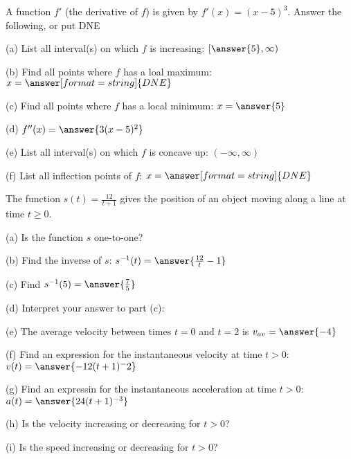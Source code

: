 \documentclass{ximera}
\begin{document}
\begin{exercise}
A function $f'$ (the derivative of $f$) is given by $f'(x)=(x-5)^3$. Answer the following, or put DNE

(a) List all interval(s) on which $f$ is increasing: $[\answer{5},\infty)$

(b) Find all points where $f$ has a loal maximum: $x=\answer[format=string]{DNE}$

(c) Find all points where $f$ has a local minimum: $x=\answer{5}$

(d) $f''(x)=\answer{3(x-5)^2}$

(e) List all interval(s) on which $f$ is concave up: $(-\infty,\infty)$

(f) List all inflection points of $f$: $x=\answer[format=string]{DNE}$

\end{exercise}

\begin{exercise}
The function $s(t)=\frac{12}{t+1}$ gives the position of an object moving along a line at time $t\geq 0$. 

(a) Is the function $s$ one-to-one? 
\begin{multipleChoice}
\end{multipleChoice}

(b) Find the inverse of $s$: $s^{-1}(t)=\answer{\frac{12}{t}-1}$

(c) Find $s^{-1}(5)=\answer{\frac{7}{5}}$

(d) Interpret your answer to part (c):
\begin{multipleChoice}
\end{multipleChoice}

(e) The average velocity between times $t=0$ and $t=2$ is $v_{av}=\answer{-4}$

(f) Find an expression for the instantaneous velocity at time $t>0$: $v(t)=\answer{-12(t+1)^-2}$

(g) Find an expressin for the instantaneous acceleration at time $t>0$: $a(t)=\answer{24(t+1)^{-3}}$

(h) Is the velocity increasing or decreasing for $t>0$?
\begin{multipleChoice}
\end{multipleChoice}

(i) Is the speed increasing or decreasing for $t>0$?
\begin{multipleChoice}
\end{multipleChoice}
\end{exercise}
\end{document}
